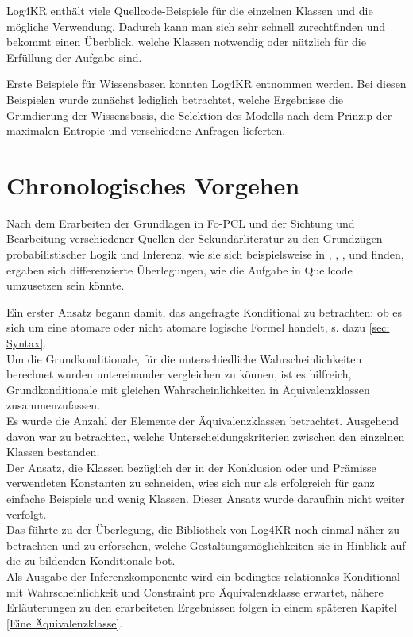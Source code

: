\documentclass[a4paper, 11pt]{book}
\begin{document}
Log4KR enthält viele Quellcode-Beispiele für die einzelnen Klassen und die mögliche Verwendung. Dadurch kann man sich sehr schnell zurechtfinden und bekommt einen Überblick, welche Klassen notwendig oder nützlich für die Erfüllung der Aufgabe sind.

Erste Beispiele für Wissensbasen konnten Log4KR entnommen werden. Bei diesen Beispielen wurde zunächst lediglich betrachtet, welche Ergebnisse die Grundierung der Wissensbasis, die Selektion des Modells nach dem Prinzip der maximalen Entropie und verschiedene Anfragen lieferten.

\section{Chronologisches Vorgehen}
Nach dem Erarbeiten der Grundlagen in Fo-PCL und der Sichtung und Bearbeitung verschiedener Quellen der Sekundärliteratur zu den Grundzügen probabilistischer Logik und Inferenz, wie sie sich beispielsweise in \cite{Fis09}, \cite{Fis10},  \cite{FLT09}, \cite{KIBFT11} und \cite{RKI97} finden, ergaben sich differenzierte Überlegungen, wie die Aufgabe in Quellcode umzusetzen sein könnte.

Ein erster Ansatz begann damit, das angefragte Konditional zu betrachten: ob es sich um eine atomare oder nicht atomare logische Formel handelt, s. dazu \ref{sec: Syntax}.\\
Um die Grundkonditionale, für die unterschiedliche Wahrscheinlichkeiten berechnet wurden untereinander vergleichen zu können, ist es hilfreich, Grundkonditionale mit gleichen Wahrscheinlichkeiten in Äquivalenzklassen  zusammenzufassen.\\
Es wurde die Anzahl der Elemente der Äquivalenzklassen  betrachtet. Ausgehend davon war zu betrachten, welche Unterscheidungskriterien zwischen den einzelnen Klassen bestanden.\\
Der Ansatz, die Klassen bezüglich der in der Konklusion oder und Prämisse verwendeten Konstanten zu schneiden, wies sich nur als erfolgreich für ganz einfache Beispiele und wenig Klassen. Dieser Ansatz wurde daraufhin nicht weiter verfolgt.\\
Das führte zu der Überlegung, die Bibliothek von Log4KR noch einmal näher zu betrachten und zu erforschen, welche Gestaltungsmöglichkeiten sie in Hinblick auf die zu bildenden Konditionale bot.\\
Als Ausgabe der Inferenzkomponente wird ein bedingtes relationales Konditional mit Wahrscheinlichkeit und Constraint pro Äquivalenzklasse erwartet, nähere Erläuterungen zu den erarbeiteten Ergebnissen folgen in einem späteren Kapitel \ref{Eine Äquivalenzklasse}.
\end{document}
